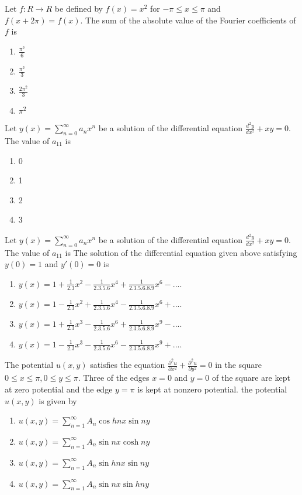 \item Let $f:R\rightarrow R$ be defined by $f(x)=x^2$ for $-\pi \leq x \leq \pi$ and $f(x+2\pi)=f(x).$  
The sum of the absolute value of the Fourier coefficients of $f$ is
\begin{enumerate}
    \item $\frac{\pi^2}{6}$
    \item $\frac{\pi^2}{3}$
    \item $\frac{2\pi^2}{3}$
    \item $\pi^2$ \\
\end{enumerate}

\item Let $y(x)=\sum_{n=0}^\infty a_n x^n$ be a solution of the differential equation $\frac{d^2 y}{dx^2}+xy=0.$
The value of $a_{11}$ is 
\begin{enumerate}
    \item 0
    \item 1
    \item 2 
    \item 3 \\
\end{enumerate}

\item Let $y(x)=\sum_{n=0}^\infty a_n x^n$ be a solution of the differential equation $\frac{d^2 y}{dx^2}+xy=0.$
The value of $a_11$ is The solution of the differential equation given above satisfying $y(0)=1$ and $y'(0)=0$ is 
\begin{enumerate}
    \item $y(x)=1+\frac{1}{2.3}x^2-\frac{1}{2.3.5.6}x^4+\frac{1}{2.3.5.6.8.9}x^6-....$
    \item $y(x)=1-\frac{1}{2.3}x^2+\frac{1}{2.3.5.6}x^4-\frac{1}{2.3.5.6.8.9}x^6+....$
    \item $y(x)=1+\frac{1}{2.3}x^3-\frac{1}{2.3.5.6}x^6+\frac{1}{2.3.5.6.8.9}x^9-....$
    \item $y(x)=1-\frac{1}{2.3}x^3-\frac{1}{2.3.5.6}x^6-\frac{1}{2.3.5.6.8.9}x^9+....$ \\
\end{enumerate}

\item The potential $u(x,y)$ satisfies the equation $\frac{\partial^2 u}{\partial x^2}+\frac{\partial^2 u}{\partial y^2}=0$ in the square $0 \leq x \leq \pi, 0\leq y \leq \pi.$ Three of the edges $x=0$ and $y=0$ of the square are kept at zero potential and the edge $y=\pi$ is kept at nonzero potential. the potential $u(x,y)$ is given by 
\begin{enumerate}
 \item $u(x,y)=\sum_{n=1}^\infty A_n \cos h nx \sin ny$
 \item $u(x,y)=\sum_{n=1}^\infty A_n \sin nx \cosh ny$
 \item $u(x,y)=\sum_{n=1}^\infty A_n \sin h nx \sin ny$
 \item $u(x,y)=\sum_{n=1}^\infty A_n \sin nx \sin h ny$ \\
\end{enumerate}

